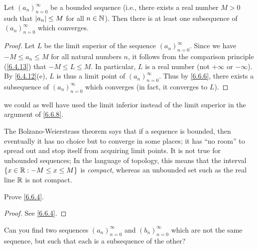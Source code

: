 \begin{thm}\label{6.6.8}
  Let \((a_n)_{n = 0}^\infty\) be a bounded sequence
  (i.e., there exists a real number \(M > 0\) such that \(\left\lvert a_n\right\rvert \leq M\) for all \(n \in \mathbb{N}\)).
  Then there is at least one subsequence of \((a_n)_{n = 0}^\infty\) which converges.
\end{thm}

\begin{proof}
  Let \(L\) be the limit superior of the sequence \((a_n)_{n = 0}^\infty\).
  Since we have \(-M \leq a_n \leq M\) for all natural numbers \(n\), it follows from the comparison principle (\cref{6.4.13}) that \(-M \leq L \leq M\).
  In particular, \(L\) is a real number (not \(+\infty\) or \(-\infty\)).
  By \cref{6.4.12}(e), \(L\) is thus a limit point of \((a_n)_{n = 0}^\infty\).
  Thus by \cref{6.6.6}, there exists a subsequence of \((a_n)_{n = 0}^\infty\) which converges
  (in fact, it converges to \(L\)).
\end{proof}

\begin{note}
  we could as well have used the limit inferior instead of the limit superior in the argument of \cref{6.6.8}.
\end{note}

\begin{rmk}\label{6.6.9}
  The Bolzano-Weierstrass theorem says that if a sequence is bounded, then eventually it has no choice but to converge in some places;
  it has ``no room'' to spread out and stop itself from acquiring limit points.
  It is not true for unbounded sequences;
  In the language of topology, this means that the interval \(\{x \in \mathbb{R} : -M \leq x \leq M\}\) is \emph{compact}, whereas an unbounded set such as the real line \(\mathbb{R}\) is not compact.
\end{rmk}

\exercisesection

\begin{ex}\label{ex:6.6.1}
  Prove \cref{6.6.4}.
\end{ex}

\begin{proof}
  See \cref{6.6.4}.
\end{proof}

\begin{ex}\label{ex:6.6.2}
  Can you find two sequences \((a_n)_{n = 0}^\infty\) and \((b_n)_{n = 0}^\infty\) which are not the same sequence, but such that each is a subsequence of the other?
\end{ex}

